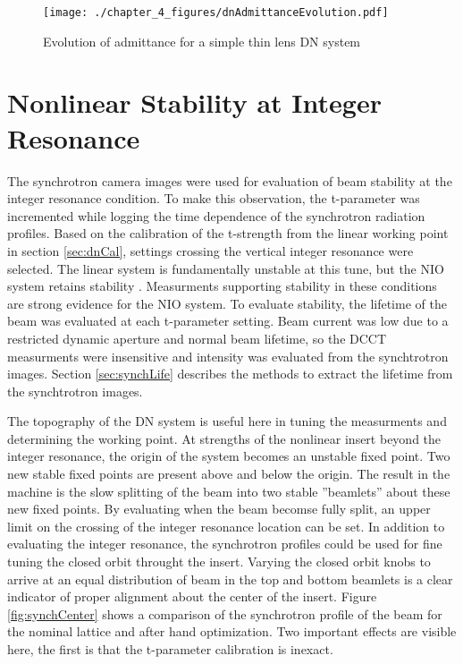 \begin{figure}
	\centering
	\texttt{[image: ./chapter\_4\_figures/dnAdmittanceEvolution.pdf]}
	\caption{Evolution of admittance for a simple thin lens DN system}
	\label{fig:dnAdmitEvolve}
\end{figure}


\section{Nonlinear Stability at Integer Resonance} \label{sec:intCross}
The synchrotron camera images were used for evaluation of beam stability at the integer resonance condition. To make this observation, the t-parameter was incremented while logging the time dependence of the synchrotron radiation profiles. Based on the calibration of the t-strength from the linear working point in section \ref{sec:dnCal}, settings crossing the vertical integer resonance were selected. The linear system is fundamentally unstable at this tune, but the NIO system retains stability . Measurments supporting stability in these conditions are strong evidence for the NIO system. To evaluate stability, the lifetime of the beam was evaluated at each t-parameter setting. Beam current was low due to a restricted dynamic aperture and normal beam lifetime, so the DCCT measurments were insensitive and intensity was evaluated from the synchtrotron images. Section \ref{sec:synchLife} describes the methods to extract the lifetime from the synchtrotron images.

The topography of the DN system is useful here in tuning the measurments and determining the working point. At strengths of the nonlinear insert beyond the integer resonance, the origin of the system becomes an unstable fixed point. Two new stable fixed points are present above and below the origin. The result in the machine is the slow splitting of the beam into two stable ”beamlets” about these new fixed points. By evaluating when the beam becomse fully split, an upper limit on the crossing of the integer resonance location can be set. In addition to evaluating the integer resonance, the synchrotron profiles could be used for fine tuning the closed orbit throught the insert. Varying the closed orbit knobs to arrive at an equal distribution of beam in the top and bottom beamlets is a  clear indicator of proper alignment about the center of the insert. Figure \ref{fig:synchCenter} shows a comparison of the synchrotron profile of the beam for the nominal lattice and after hand optimization. Two important effects are visible here, the first is that the t-parameter calibration is inexact. 

